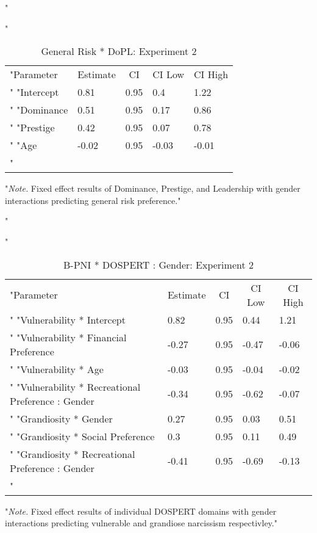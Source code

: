 \documentclass[
"  donotrepeattitle,doc, 12pt, a4paper,floatsintext]{apa7}"
\begin{document}
\begin{table}[h]
\begin{center}
\begin{threeparttable}
"\caption{\label{tab:PNI Model DoPL Exp 2}General Risk * DoPL: Experiment 2}"
\begin{tabular}{lllll}
\toprule
"Parameter & \multicolumn{1}{c}{Estimate} & \multicolumn{1}{c}{CI} & \multicolumn{1}{c}{CI Low} & \multicolumn{1}{c}{CI High}\\"
\midrule
"Intercept & 0.81 & 0.95 & 0.4 & 1.22\\"
"Dominance & 0.51 & 0.95 & 0.17 & 0.86\\"
"Prestige & 0.42 & 0.95 & 0.07 & 0.78\\"
"Age & -0.02 & 0.95 & -0.03 & -0.01\\"
\bottomrule
\addlinespace
\end{tabular}
\begin{tablenotes}[para]
"\normalsize{\textit{Note.} Fixed effect results of Dominance, Prestige, and Leadership with gender interactions predicting general risk preference.}"
\end{tablenotes}
\end{threeparttable}
\end{center}
\end{table}
\begin{table}[h]
\begin{center}
\begin{threeparttable}
"\caption{\label{tab:Vulnerability and Grandiosity_DOSPERT}B-PNI * DOSPERT : Gender: Experiment 2}"
\begin{tabular}{lllll}
\toprule
"Parameter & \multicolumn{1}{c}{Estimate} & \multicolumn{1}{c}{CI} & \multicolumn{1}{c}{CI Low} & \multicolumn{1}{c}{CI High}\\"
\midrule
"Vulnerability * Intercept & 0.82 & 0.95 & 0.44 & 1.21\\"
"Vulnerability * Financial Preference & -0.27 & 0.95 & -0.47 & -0.06\\"
"Vulnerability * Age & -0.03 & 0.95 & -0.04 & -0.02\\"
"Vulnerability * Recreational Preference : Gender & -0.34 & 0.95 & -0.62 & -0.07\\"
"Grandiosity * Gender & 0.27 & 0.95 & 0.03 & 0.51\\"
"Grandiosity * Social Preference & 0.3 & 0.95 & 0.11 & 0.49\\"
"Grandiosity * Recreational Preference : Gender & -0.41 & 0.95 & -0.69 & -0.13\\"
\bottomrule
\addlinespace
\end{tabular}
\begin{tablenotes}[para]
"\normalsize{\textit{Note.} Fixed effect results of individual DOSPERT domains with gender interactions predicting vulnerable and grandiose narcissism respectivley.}"
\end{tablenotes}
\end{threeparttable}
\end{center}
\end{table}
\end{document}
